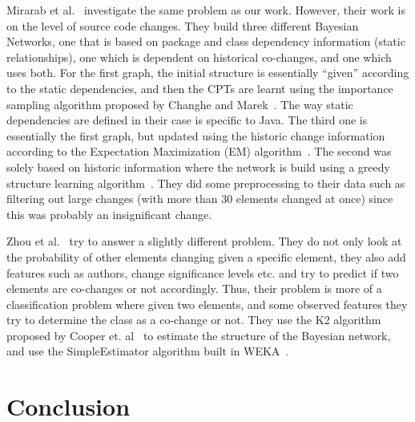 \documentclass{article}
\begin{document}
Mirarab et al.~\cite{mirarab2007} investigate the same problem as our work. However, their work is on the level of source code changes. They build three
different Bayesian Networks, one that is based on package and class dependency information (static relationships), one which is dependent on historical
co-changes, and one which uses both. For the first graph, the initial structure is essentially ``given'' according to the static dependencies, and then the CPTs
are learnt using the importance sampling algorithm proposed by Changhe and Marek~\cite{yuan2003importance}. The way static dependencies are defined in their
case is specific to Java. The third one is essentially the first graph, but updated using the historic change information according to the Expectation
Maximization (EM) algorithm~\cite{dempster1977maximum}. The second was solely based on historic information where the network is build using a greedy structure
 learning algorithm~\cite{friedman1996learning}. They did some preprocessing to their data such as filtering out large changes (with more than 30 elements
changed at once) since this was probably an insignificant change.

Zhou et al.~\cite{zhou2008} try to answer a slightly different problem. They do not only look at the probability of other elements changing given a specific
element, they also add features such as authors, change significance levels etc. and try to predict if two elements are co-changes or not accordingly. Thus,
their problem is more of a classification problem where given two elements, and some observed features they try to determine the class as a co-change or not.
They use the K2 algorithm proposed by Cooper et. al~\cite{cooper1992bayesian} to estimate the structure of the Bayesian network, and use the SimpleEstimator
algorithm built in WEKA~\cite{witten2005data}.


\section{Conclusion}
\label{concl}




\end{document}

